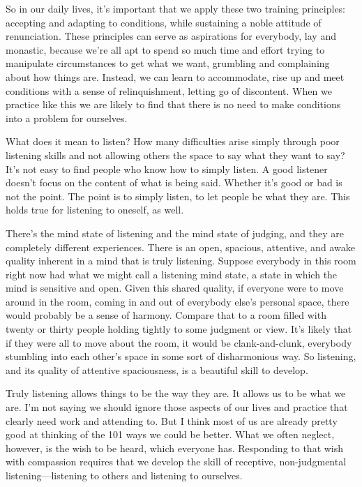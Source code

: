 So in our daily lives, it's important that we apply these two training 
principles: accepting and adapting to conditions, while sustaining a 
noble attitude of renunciation. These principles can serve as 
aspirations for everybody, lay and monastic, because we're all apt to 
spend so much time and effort trying to manipulate circumstances to get 
what we want, grumbling and complaining about how things are. Instead, 
we can learn to accommodate, rise up and meet conditions with a sense 
of relinquishment, letting go of discontent. When we practice like this 
we are likely to find that there is no need to make conditions into a 
problem for ourselves.


What does it mean to listen? How many difficulties arise simply through 
poor listening skills and not allowing others the space to say what 
they want to say? It's not easy to find people who know how to simply 
listen. A good listener doesn't focus on the content of what is being 
said. Whether it's good or bad is not the point. The point is to simply 
listen, to let people be what they are. This holds true for listening 
to oneself, as well.

There's the mind state of listening and the mind state of judging, and 
they are completely different experiences. There is an open, spacious, 
attentive, and awake quality inherent in a mind that is truly 
listening. Suppose everybody in this room right now had what we might 
call a listening mind state, a state in which the mind is sensitive and 
open. Given this shared quality, if everyone were to move around in the 
room, coming in and out of everybody else's personal space, there would 
probably be a sense of harmony. Compare that to a room filled with 
twenty or thirty people holding tightly to some judgment or view. It's 
likely that if they were all to move about the room, it would be 
clank-and-clunk, everybody stumbling into each other's space in some 
sort of disharmonious way. So listening, and its quality of attentive 
spaciousness, is a beautiful skill to develop.

Truly listening allows things to be the way they are. It allows us to 
be what we are. I'm not saying we should ignore those aspects of our 
lives and practice that clearly need work and attending to. But I think 
most of us are already pretty good at thinking of the 101 ways we could 
be better. What we often neglect, however, is the wish to be heard, 
which everyone has. Responding to that wish with compassion requires 
that we develop the skill of receptive, non-judgmental 
listening---listening to others and listening to ourselves.

